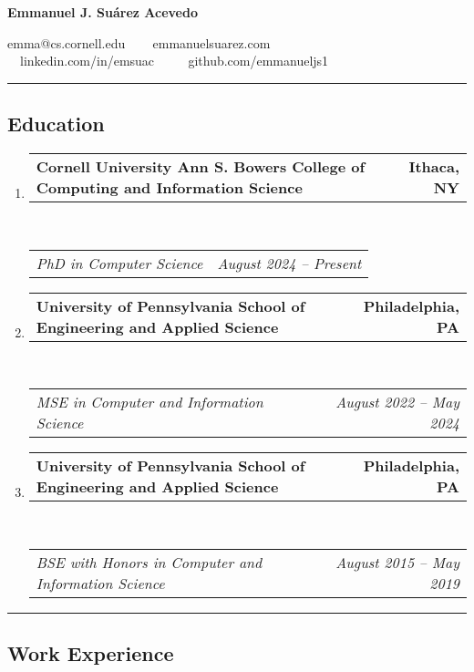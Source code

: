 \documentclass[letterpaper]{article}
\makeatletter
\newif\iflong
\newcommand{\headerrow}[2]
{\begin{tabular*}{\linewidth}{l@{\extracolsep{\fill}}r}
	#1 &
	#2 \\
\end{tabular*}}
\makeatother
\begin{document}
\begin{center}
{\LARGE \textbf{Emmanuel J. Suárez Acevedo}}

emma@cs.cornell.edu \ \textbullet
\ \ emmanuelsuarez.com \\

\ \ linkedin.com/in/emsuac \ \ \textbullet
\ \ github.com/emmanueljs1\\
\end{center}
\hrule

\iflong
\subsection*{Research Interests}
\begin{enumerate}[label=]
       \parskip=-0.25em

    \item Programming language theory, type theory, proof assistants
\end{enumerate}
\hrule
\fi

\subsection*{Education}
  
\begin{enumerate}[label=]
	\parskip=-0.05em
	\item
	\headerrow
        {\textbf{Cornell University Ann S. Bowers College of Computing and Information Science}}
		{\textbf{Ithaca, NY}}
	\\
	\headerrow
		{\emph{PhD in Computer Science}}
        {\emph{August 2024 -- Present}}

	\item 
	\headerrow
		{\textbf{University of Pennsylvania School of Engineering and Applied Science}}
		{\textbf{Philadelphia, PA}}
	\\
	\headerrow
		{\emph{MSE in Computer and Information Science}}
		{\emph{August 2022 -- May 2024}}

	\item 
	\headerrow
		{\textbf{University of Pennsylvania School of Engineering and Applied Science}}
		{\textbf{Philadelphia, PA}}
	\\
	\headerrow
		{\emph{BSE with Honors in Computer and Information Science}}
		{\emph{August 2015 -- May 2019}}

\end{enumerate}

\hrule
\subsection*{Work Experience}
\end{document}
